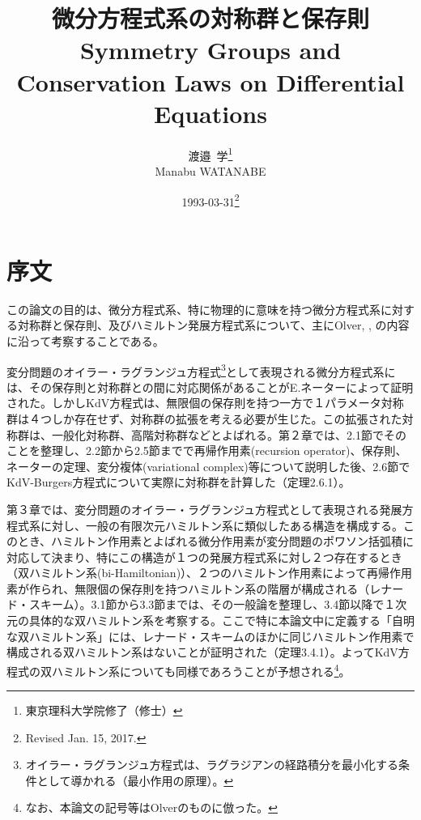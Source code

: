 \documentclass[a4paper, 11pt]{report}
\title{微分方程式系の対称群と保存則\\
Symmetry Groups and Conservation Laws on Differential Equations}
\author{渡邉\ 学\thanks{東京理科大学院修了（修士）}\\
Manabu WATANABE}
\date{1993-03-31\thanks{Revised Jan. 15, 2017.}}
\theoremstyle{definition}
\begin{document}
\sffamily

\maketitle

\tableofcontents
\newpage

\chapter{序文}

 この論文の目的は、微分方程式系、特に物理的に意味を持つ微分方程式系に対する対称群と保存則、及びハミルトン発展方程式系について、主にOlver\cite{Olver2}, \cite{Olver4}, \cite{Olver5}の内容に沿って考察することである。

 変分問題のオイラー・ラグランジュ方程式\footnote{オイラー・ラグランジュ方程式は、ラグラジアンの経路積分を最小化する条件として導かれる（最小作用の原理）。}として表現される微分方程式系には、その保存則と対称群との間に対応関係があることがE.ネーターによって証明された。しかしKdV方程式は、無限個の保存則を持つ一方で１パラメータ対称群は４つしか存在せず、対称群の拡張を考える必要が生じた。この拡張された対称群は、一般化対称群、高階対称群などとよばれる。第２章では、2.1節でそのことを整理し、2.2節から2.5節までで再帰作用素(recursion operator)、保存則、ネーターの定理、変分複体(variational complex)等について説明した後、2.6節でKdV-Burgers方程式について実際に対称群を計算した（定理2.6.1）。

 第３章では、変分問題のオイラー・ラグランジュ方程式として表現される発展方程式系に対し、一般の有限次元ハミルトン系に類似したある構造を構成する。このとき、ハミルトン作用素とよばれる微分作用素が変分問題のポワソン括弧積に対応して決まり、特にこの構造が１つの発展方程式系に対し２つ存在するとき（双ハミルトン系(bi-Hamiltonian)）、２つのハミルトン作用素によって再帰作用素が作られ、無限個の保存則を持つハミルトン系の階層が構成される（レナード・スキーム）。3.1節から3.3節までは、その一般論を整理し、3.4節以降で１次元の具体的な双ハミルトン系を考察する。ここで特に本論文中に定義する「自明な双ハミルトン系」には、レナード・スキームのほかに同じハミルトン作用素で構成される双ハミルトン系はないことが証明された（定理3.4.1）。よってKdV方程式の双ハミルトン系についても同様であろうことが予想される\footnote{なお、本論文の記号等はOlver\cite{Olver4}のものに倣った。}。\\
\end{document}
